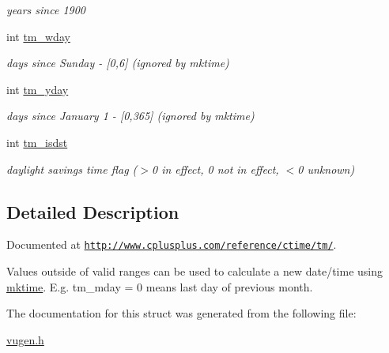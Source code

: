 \begin{DoxyCompactItemize}
\begin{DoxyCompactList}\small\item\em years since 1900 \end{DoxyCompactList}\item 
\hypertarget{structtm_afe81a8c46f1c693c43f259b288859f4f}{int \hyperlink{structtm_afe81a8c46f1c693c43f259b288859f4f}{tm\-\_\-wday}}\label{structtm_afe81a8c46f1c693c43f259b288859f4f}

\begin{DoxyCompactList}\small\item\em days since Sunday -\/ \mbox{[}0,6\mbox{]} (ignored by mktime) \end{DoxyCompactList}\item 
\hypertarget{structtm_a93a0ba77cc23796df84405dcbcc57eb1}{int \hyperlink{structtm_a93a0ba77cc23796df84405dcbcc57eb1}{tm\-\_\-yday}}\label{structtm_a93a0ba77cc23796df84405dcbcc57eb1}

\begin{DoxyCompactList}\small\item\em days since January 1 -\/ \mbox{[}0,365\mbox{]} (ignored by mktime) \end{DoxyCompactList}\item 
\hypertarget{structtm_a5645ca0580c8ab2c24f6c2965d9c9f9c}{int \hyperlink{structtm_a5645ca0580c8ab2c24f6c2965d9c9f9c}{tm\-\_\-isdst}}\label{structtm_a5645ca0580c8ab2c24f6c2965d9c9f9c}

\begin{DoxyCompactList}\small\item\em daylight savings time flag ($>$0 in effect, 0 not in effect, $<$0 unknown) \end{DoxyCompactList}\end{DoxyCompactItemize}


\subsection{Detailed Description}
Documented at \href{http://www.cplusplus.com/reference/ctime/tm/}{\tt http\-://www.\-cplusplus.\-com/reference/ctime/tm/}. \par
Values outside of valid ranges can be used to calculate a new date/time using \hyperlink{group__time_gae114b9ba0fce4e2d6297e0e66768bb75}{mktime}. E.\-g. tm\-\_\-mday = 0 means last day of previous month. 

The documentation for this struct was generated from the following file\-:\begin{DoxyCompactItemize}
\item 
\hyperlink{vugen_8h}{vugen.\-h}\end{DoxyCompactItemize}
